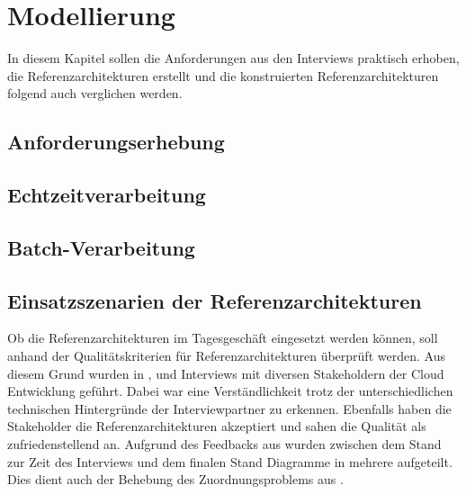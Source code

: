 \chapter{Modellierung}
In diesem Kapitel sollen die Anforderungen aus den Interviews praktisch erhoben, die Referenzarchitekturen erstellt und die konstruierten Referenzarchitekturen folgend auch verglichen werden.
\section{Anforderungserhebung}


\section{Echtzeitverarbeitung}\label{chap:ra-rt}


\section{Batch-Verarbeitung}\label{chap:ra-batch}


\section{Einsatzszenarien der Referenzarchitekturen}
Ob die Referenzarchitekturen im Tagesgeschäft eingesetzt werden können, soll anhand der Qualitätskriterien für Referenzarchitekturen überprüft werden. Aus diesem Grund wurden in  ,  und  Interviews mit diversen Stakeholdern der Cloud Entwicklung geführt. Dabei war eine Verständlichkeit trotz der unterschiedlichen technischen Hintergründe der Interviewpartner zu erkennen. Ebenfalls haben die Stakeholder die Referenzarchitekturen akzeptiert und sahen die Qualität als zufriedenstellend an. Aufgrund des Feedbacks aus  wurden zwischen dem Stand zur Zeit des Interviews und dem finalen Stand Diagramme in mehrere aufgeteilt. Dies dient auch der Behebung des Zuordnungsproblems aus .

